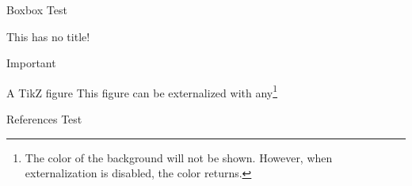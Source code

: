 \documentclass[a3,2col]{commsysposter}
\begin{document}
\begin{postercolumn}
	\begin{posterbox}[postergreen]{Boxbox}
		Test
	\end{posterbox}
	\begin{posterbox}{}
		This has no title!
	\end{posterbox}
	\begin{posterbox}[posterpurple]{Important}
		\lipsum[3-4]
	\end{posterbox}
	\begin{posterbox}{A TikZ figure}
		This figure can be externalized with any\footnote{The color of the background will not be shown. However, when externalization is disabled, the color returns.}

	\end{posterbox}
	\begin{posterbox}{References}
		Test
	\end{posterbox}
\end{postercolumn}
\end{document}
